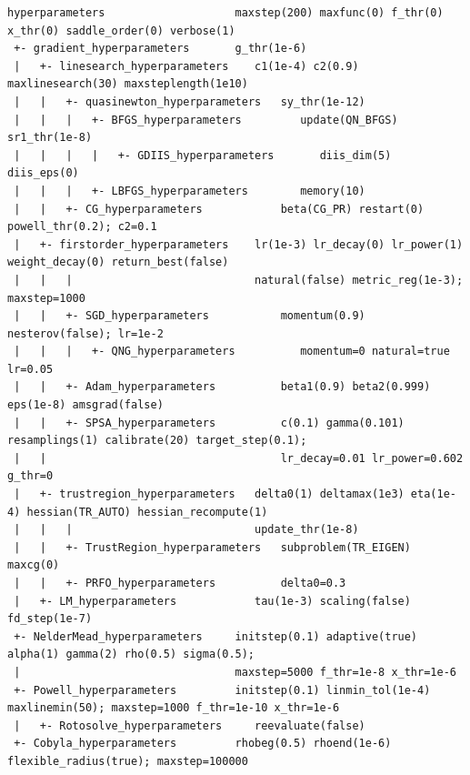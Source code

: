 \begin{lstlisting}
hyperparameters                    maxstep(200) maxfunc(0) f_thr(0) x_thr(0) saddle_order(0) verbose(1)
 +- gradient_hyperparameters       g_thr(1e-6)
 |   +- linesearch_hyperparameters    c1(1e-4) c2(0.9) maxlinesearch(30) maxsteplength(1e10)
 |   |   +- quasinewton_hyperparameters   sy_thr(1e-12)
 |   |   |   +- BFGS_hyperparameters         update(QN_BFGS) sr1_thr(1e-8)
 |   |   |   |   +- GDIIS_hyperparameters       diis_dim(5) diis_eps(0)
 |   |   |   +- LBFGS_hyperparameters        memory(10)
 |   |   +- CG_hyperparameters            beta(CG_PR) restart(0) powell_thr(0.2); c2=0.1
 |   +- firstorder_hyperparameters    lr(1e-3) lr_decay(0) lr_power(1) weight_decay(0) return_best(false)
 |   |   |                            natural(false) metric_reg(1e-3); maxstep=1000
 |   |   +- SGD_hyperparameters           momentum(0.9) nesterov(false); lr=1e-2
 |   |   |   +- QNG_hyperparameters          momentum=0 natural=true lr=0.05
 |   |   +- Adam_hyperparameters          beta1(0.9) beta2(0.999) eps(1e-8) amsgrad(false)
 |   |   +- SPSA_hyperparameters          c(0.1) gamma(0.101) resamplings(1) calibrate(20) target_step(0.1);
 |   |                                    lr_decay=0.01 lr_power=0.602 g_thr=0
 |   +- trustregion_hyperparameters   delta0(1) deltamax(1e3) eta(1e-4) hessian(TR_AUTO) hessian_recompute(1)
 |   |   |                            update_thr(1e-8)
 |   |   +- TrustRegion_hyperparameters   subproblem(TR_EIGEN) maxcg(0)
 |   |   +- PRFO_hyperparameters          delta0=0.3
 |   +- LM_hyperparameters            tau(1e-3) scaling(false) fd_step(1e-7)
 +- NelderMead_hyperparameters     initstep(0.1) adaptive(true) alpha(1) gamma(2) rho(0.5) sigma(0.5);
 |                                 maxstep=5000 f_thr=1e-8 x_thr=1e-6
 +- Powell_hyperparameters         initstep(0.1) linmin_tol(1e-4) maxlinemin(50); maxstep=1000 f_thr=1e-10 x_thr=1e-6
 |   +- Rotosolve_hyperparameters     reevaluate(false)
 +- Cobyla_hyperparameters         rhobeg(0.5) rhoend(1e-6) flexible_radius(true); maxstep=100000
\end{lstlisting}

